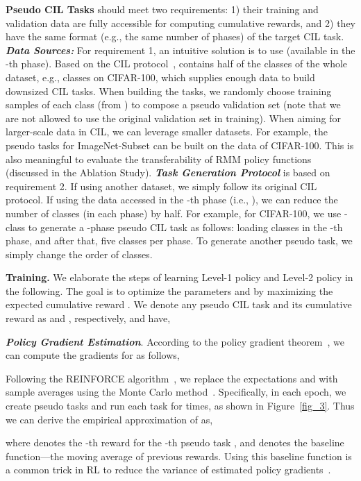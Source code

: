 \documentclass{article}
\newcommand{\myparagraph}[1]{\vspace{0.1em}\noindent\textbf{#1}}
\begin{document}
\myparagraph{Pseudo CIL Tasks} should meet two requirements:
1) their training and validation data are fully accessible for computing cumulative rewards, and 2) they have the same format (e.g., the same number of phases) of the target CIL task.
\textbf{\emph{Data Sources:}} 
For requirement 1, 
an intuitive solution is to use  (available in the -th phase). Based on the CIL protocol~\cite{douillard2020podnet,hou2019lucir,hu2021cil,Liu2020AANets},  contains half of the classes of the whole dataset, e.g.,  classes on CIFAR-100, which supplies enough data to build downsized CIL tasks.
When building the tasks, we randomly choose  training samples of each class (from ) to compose a pseudo validation set (note that we are not allowed to use the original validation set in training). 
When aiming for larger-scale data in CIL, 
we can leverage smaller datasets. For example, the pseudo tasks for ImageNet-Subset can be built on the data of CIFAR-100.
This is also meaningful to evaluate the transferability of RMM policy functions (discussed in the Ablation Study).
\textbf{\emph{Task Generation Protocol}} is based on requirement 2. 
If using another dataset, we simply follow its original CIL protocol. 
If using the data accessed in the -th phase (i.e., ), we can reduce the number of classes (in each phase) by half.
For example, for CIFAR-100, we use -class  to generate a -phase pseudo CIL task as follows: loading  classes in the -th phase, and after that, five classes per phase. 
To generate another pseudo task, we simply change the order of classes.

\textbf{Training.}
We elaborate the steps of learning Level-1 policy  and Level-2 policy  in the following.
The goal is to optimize the parameters  and  by maximizing the expected cumulative reward .
We denote any pseudo CIL task and its cumulative reward as  and , respectively, and have,

\textbf{\emph{Policy Gradient Estimation}}.
According to the policy gradient theorem~\cite{williams1992simple}, we can compute the gradients for  as follows,

Following the REINFORCE algorithm~\cite{williams1992simple}, we replace the expectations  and  with sample averages using the Monte Carlo method~\cite{hammersley2013monte}.
Specifically, in each epoch, we create  pseudo tasks and run each task for  times, as shown in Figure~\ref{fig_3}.
Thus we can derive the empirical approximation of  as,

where  denotes the -th reward for the -th pseudo task , and  denotes the baseline function---the moving average of previous rewards. 
Using this baseline function is a common trick in RL to reduce the variance of estimated policy gradients~\cite{kool2019buy,rennie2017self,ZophL17}.
\end{document}
